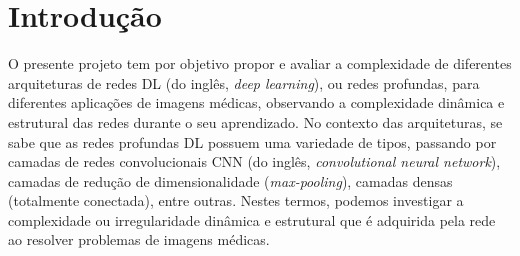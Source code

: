 \documentclass[
	12pt,				%
	openany,oneside,
	a4paper,			%
	english,			%
	brazil,				%
	]{abntex2}
\begin{document}




\tableofcontents*
\cleardoublepage


\textual
\setcounter{page}{1}

\chapter{Introdução}

O presente projeto tem por objetivo propor e avaliar a complexidade de diferentes arquiteturas de redes DL (do inglês, \textit{deep learning}), ou redes profundas, para diferentes aplicações de imagens médicas, observando a complexidade dinâmica e estrutural das redes durante o seu aprendizado. No contexto das arquiteturas, se sabe que as redes profundas DL possuem uma variedade de tipos, passando por camadas de redes convolucionais CNN (do inglês, \textit{convolutional neural network}), camadas de redução de dimensionalidade (\textit{max-pooling}), camadas densas (totalmente conectada), entre outras. Nestes termos, podemos investigar a complexidade ou irregularidade dinâmica e estrutural que é adquirida pela rede ao resolver problemas de imagens médicas.
\end{document}
